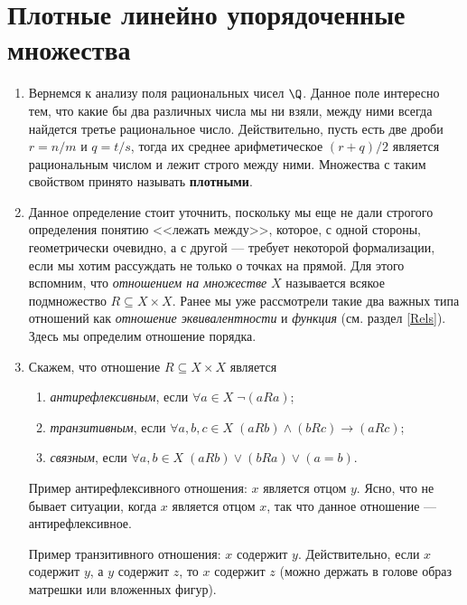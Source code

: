 \section{Плотные линейно упорядоченные множества}


\begin{enumerate}
\item Вернемся к анализу поля рациональных чисел $\Q$. Данное поле интересно тем, что какие бы два различных числа мы ни взяли, между ними всегда найдется третье рациональное число. Действительно, пусть есть две дроби $r=n/m$ и $q=t/s$, тогда их среднее арифметическое $(r+q)/2$ является рациональным числом и лежит строго между ними.
Множества с таким свойством принято называть \textbf{плотными}.

\item Данное определение стоит уточнить, поскольку мы еще не дали строгого определения понятию <<лежать между>>, которое, с одной стороны, геометрически очевидно, а с другой --- требует некоторой формализации, если мы хотим рассуждать не только о точках на прямой. Для этого вспомним, что \textit{отношением на множестве} $X$ называется всякое подмножество $R\subseteq X\times X$. Ранее мы уже рассмотрели такие два важных типа отношений как \textit{отношение эквивалентности} и \textit{функция} (см. раздел \ref{Rels}). Здесь мы определим отношение порядка.

\item Скажем, что отношение $R\subseteq X\times X$ является
\begin{enumerate}[L1]
\item \textit{антирефлексивным}, если $\forall a\in X\;\neg (aRa)$;
\item \textit{транзитивным}, если $\forall a,b,c\in X\;(aRb)\land(bRc)\to(aRc)$;
\item \textit{связным}, если $\forall a,b\in X\;(aRb)\lor(bRa)\lor(a=b)$.
\end{enumerate}

Пример антирефлексивного отношения: $x$ является отцом $y$. Ясно, что не бывает ситуации, когда $x$ является отцом $x$, так что данное отношение --- антирефлексивное.

Пример транзитивного отношения: $x$ содержит $y$. Действительно, если $x$ содержит $y$, а $y$ содержит $z$, то $x$ содержит $z$ (можно держать в голове образ матрешки или вложенных фигур).


\end{enumerate}
